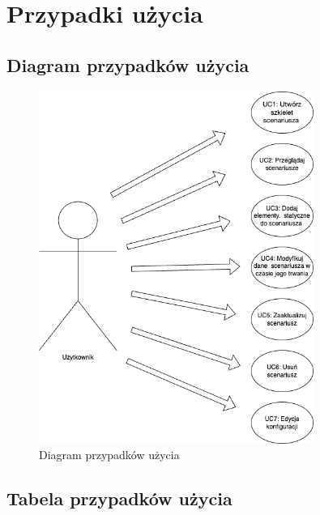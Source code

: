 \chapter{Przypadki użycia}

\section{Diagram przypadków użycia}

\begin{figure}[h!] 
\centering
\includegraphics[width=0.8\textwidth]{resources/local/use-case-diagram.png}
\caption{Diagram przypadków użycia} 
\label{fig:use_case_diagram}
\end{figure}

\section{Tabela przypadków użycia}

